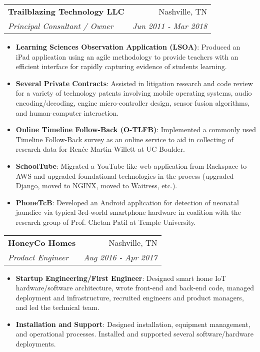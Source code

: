 \documentclass[letterpaper,10pt]{article}
\makeatletter
\newcommand{\resumeItem}[2]{
  \item\small{
    \textbf{#1}{: #2 \vspace{-2pt}}
  }
}
\newcommand{\resumeSubheading}[4]{
  \vspace{-1pt}\item
    \begin{tabular*}{0.97\textwidth}{l@{\extracolsep{\fill}}r}
      \textbf{#1} & #2 \\
      \textit{\small#3} & \textit{\small #4} \\
    \end{tabular*}\vspace{-5pt}
}
\newcommand{\resumeItemListStart}{\begin{itemize}}
\newcommand{\resumeItemListEnd}{\end{itemize}\vspace{-5pt}}
\makeatother
\begin{document}
    \resumeSubheading
      {Trailblazing Technology LLC}{Nashville, TN}
      {Principal Consultant / Owner}{Jun 2011 - Mar 2018}
      \resumeItemListStart
        \resumeItem{Learning Sciences Observation Application (LSOA)}
          {Produced an iPad application using an agile methodology to provide teachers with an efficient interface for rapidly capturing evidence of students learning.}
        \resumeItem{Several Private Contracts}
          {Assisted in litigation research and code review for a variety of technology patents involving mobile operating systems, audio encoding/decoding, engine micro-controller design, sensor fusion algorithms, and human-computer interaction.}
        \resumeItem{Online Timeline Follow-Back (O-TLFB)}
          {Implemented a commonly used Timeline Follow-Back survey as an online service to aid in collecting of research data for Renée Martin-Willett at UC Boulder.}
        \resumeItem{SchoolTube}
          {Migrated a YouTube-like web application from Rackspace to AWS and upgraded foundational technologies in the process (upgraded Django, moved to NGINX, moved to Waitress, etc.).}
        \resumeItem{PhoneTcB}
          {Developed an Android application for detection of neonatal jaundice via typical 3rd-world smartphone hardware in coalition with the research group of Prof. Chetan Patil at Temple University.}
      \resumeItemListEnd

    \resumeSubheading
      {HoneyCo Homes}{Nashville, TN}
      {Product Engineer}{Aug 2016 - Apr 2017}
      \resumeItemListStart
        \resumeItem{Startup Engineering/First Engineer}
          {Designed smart home IoT hardware/software architecture, wrote front-end and back-end code, managed deployment and infrastructure, recruited engineers and product managers, and led the technical team.}
        \resumeItem{Installation and Support}
          {Designed installation, equipment management, and operational processes. Installed and supported several software/hardware deployments.}
      \resumeItemListEnd
\end{document}
